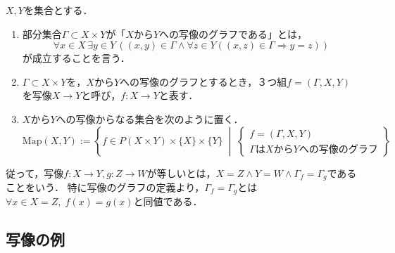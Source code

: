 \documentclass[uplatex, 12pt, dvipdfmx]{jsreport}
\begin{document}
\begin{definition}[mapping]$X,Y$を集合とする．
    \begin{enumerate}
        \item 部分集合$\Gamma\subset X\times Y$が「$X$から$Y$への写像のグラフである」とは，\[\forall x\in X\, \exists y\in Y \, ((x,y)\in\Gamma\wedge \forall z\in Y((x,z)\in\Gamma\Rightarrow y=z))\]が成立することを言う．
        \item $\Gamma\subset X\times Y$を，$X$から$Y$への写像のグラフとするとき，３つ組$f=(\Gamma,X,Y)$を写像$X\to Y$と呼び，$f:X\to Y$と表す．
        \item $X$から$Y$への写像からなる集合を次のように置く．
        \[\mathrm{Map}(X,Y):=\left\{ f\in P(X\times Y)\times \{ X\}\times\{ Y\} \;\middle|\; \begin{cases}
            f=(\Gamma,X,Y)\\
            \Gamma はXからYへの写像のグラフ
        \end{cases}\right\}\]
    \end{enumerate}
\end{definition}
従って，写像$f:X\to Y,g:Z\to W$が等しいとは，$X=Z\land Y=W\land \Gamma_f=\Gamma_g$であることをいう．
特に写像のグラフの定義より，$\Gamma_f=\Gamma_g$とは$\forall x\in X=Z,\;f(x)=g(x)$と同値である．

\subsection{写像の例}
\end{document}
